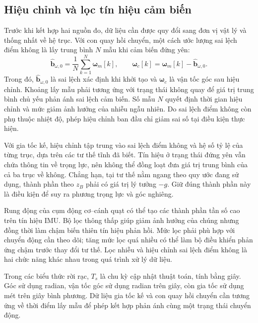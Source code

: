 \subsection{Hiệu chỉnh và lọc tín hiệu cảm biến}
\label{subsec:background-sensor-conditioning}

Trước khi kết hợp hai nguồn đo, dữ liệu cần được quy đổi sang đơn vị vật lý và thống nhất về hệ trục. Với con quay hồi chuyển, một cách ước lượng sai lệch điểm không là lấy trung bình $N$ mẫu khi cảm biến đứng yên:
\begin{equation}
    \widehat{\mathbf b}_{\omega,0}
    =\frac{1}{N}\sum_{k=1}^{N}\symbf\omega_m[k],
    \qquad
    \symbf\omega_c[k]
    =\symbf\omega_m[k]-\widehat{\mathbf b}_{\omega,0}.
    \label{eq:background-gyro-bias-correction}
\end{equation}
Trong đó, $\widehat{\mathbf b}_{\omega,0}$ là sai lệch xác định khi khởi tạo và $\symbf\omega_c$ là vận tốc góc sau hiệu chỉnh. Khoảng lấy mẫu phải tương ứng với trạng thái không quay để giá trị trung bình chủ yếu phản ánh sai lệch cảm biến. Số mẫu $N$ quyết định thời gian hiệu chỉnh và mức giảm ảnh hưởng của nhiễu ngẫu nhiên. Do sai lệch điểm không còn phụ thuộc nhiệt độ, phép hiệu chỉnh ban đầu chỉ giảm sai số tại điều kiện thực hiện.

Với gia tốc kế, hiệu chỉnh tập trung vào sai lệch điểm không và hệ số tỷ lệ của từng trục, dựa trên các tư thế tĩnh đã biết. Tín hiệu ở trạng thái đứng yên vẫn chứa thông tin về trọng lực, nên không thể đồng loạt đưa giá trị trung bình của cả ba trục về không. Chẳng hạn, tại tư thế nằm ngang theo quy ước đang sử dụng, thành phần theo $z_B$ phải có giá trị lý tưởng $-g$. Giữ đúng thành phần này là điều kiện để suy ra phương trọng lực và góc nghiêng.

Rung động của cụm động cơ--cánh quạt có thể tạo các thành phần tần số cao trên tín hiệu IMU. Bộ lọc thông thấp giúp giảm ảnh hưởng của chúng nhưng đồng thời làm chậm biến thiên tín hiệu phản hồi. Mức lọc phải phù hợp với chuyển động cần theo dõi; tăng mức lọc quá nhiều có thể làm bộ điều khiển phản ứng chậm trước thay đổi tư thế. Lọc nhiễu và hiệu chỉnh sai lệch điểm không là hai chức năng khác nhau trong quá trình xử lý dữ liệu.

Trong các biểu thức rời rạc, $T_s$ là chu kỳ cập nhật thuật toán, tính bằng giây. Góc sử dụng radian, vận tốc góc sử dụng radian trên giây, còn gia tốc sử dụng mét trên giây bình phương. Dữ liệu gia tốc kế và con quay hồi chuyển cần tương ứng về thời điểm lấy mẫu để phép kết hợp phản ánh cùng một trạng thái chuyển động.


